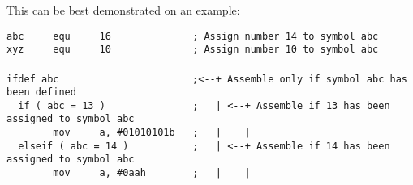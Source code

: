         This can be best demonstrated on an example:
                \begin{code}[h!]
                        \mysmallfont{}
                        {\color{highlight_constant}\verb'abc'}\verb'     '{\color{highlight_directive}\verb'equ'}\verb'     '{\color{highlight_unknown_base}\verb'16'}\verb'              '{\color{highlight_comment}\verb'; Assign number 14 to symbol abc'}\\
                        {\color{highlight_constant}\verb'xyz'}\verb'     '{\color{highlight_directive}\verb'equ'}\verb'     '{\color{highlight_unknown_base}\verb'10'}\verb'              '{\color{highlight_comment}\verb'; Assign number 10 to symbol abc'}\\
                        \verb''\\
                        {\color{highlight_directive}\verb'ifdef'}\verb' '{\color{highlight_constant}\verb'abc'}\verb'                       '{\color{highlight_comment}\verb';<--+ Assemble only if symbol abc has been defined'}\\
                        \verb'  '{\color{highlight_directive}\verb'if'}\verb' '{\color{highlight_symbol}\verb'('}\verb' '{\color{highlight_constant}\verb'abc'}\verb' '{\color{highlight_symbol}\verb'='}\verb' '{\color{highlight_unknown_base}\verb'13'}\verb' '{\color{highlight_symbol}\verb')'}\verb'               '{\color{highlight_comment}\verb';   | <--+ Assemble if 13 has been assigned to symbol abc'}\\
                        \verb'        '{\color{highlight_instruction}\verb'mov'}\verb'     '{\color{highlight_sfr}\verb'a'}{\color{highlight_oper_sep}\verb','}\verb' '{\color{highlight_imm_bin}\verb'#01010101b'}\verb'   '{\color{highlight_comment}\verb';   |    |'}\\
                        \verb'  '{\color{highlight_directive}\verb'elseif'}\verb' '{\color{highlight_symbol}\verb'('}\verb' '{\color{highlight_constant}\verb'abc'}\verb' '{\color{highlight_symbol}\verb'='}\verb' '{\color{highlight_unknown_base}\verb'14'}\verb' '{\color{highlight_symbol}\verb')'}\verb'           '{\color{highlight_comment}\verb';   | <--+ Assemble if 14 has been assigned to symbol abc'}\\
                        \verb'        '{\color{highlight_instruction}\verb'mov'}\verb'     '{\color{highlight_sfr}\verb'a'}{\color{highlight_oper_sep}\verb','}\verb' '{\color{highlight_imm_hex}\verb'#0aah'}\verb'        '{\color{highlight_comment}\verb';   |    |'}\\

\end{code}
